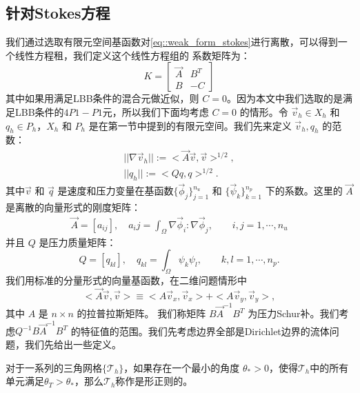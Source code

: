     \subsection{针对Stokes方程}
        我们通过选取有限元空间基函数对\eqref{eq::weak_form_stokes}进行离散，可以得到一个线性方程租，我们定义这个线性方程组的
        系数矩阵为：
        \begin{equation}
            K = \left[
                \begin{array}{ll}
                 \vec{A} & B^T\\
                 B & -C
                \end{array}
                \right]
        \end{equation}
        其中如果用满足LBB条件的混合元做近似，则 $C = 0$。因为本文中我们选取的是满足LBB条件的$4P1-P1$元，所以我们下面均考虑 $C = 0$ 的情形。令 $\vec{v}_h \in X_h$ 和 $q_h \in P_h$，$X_h$ 和 $P_h$ 是在第一节中提到的有限元空间。我们先来定义 $\vec{v}_h, q_h$ 的范数：
        \begin{align}
            ||\nabla \vec{v}_h|| := <\vec{A}\vec{v}, \vec{v}>^{1/2}, \\
            ||q_h|| := <Qq, q>^{1/2}.
            \label{eq::norm}
        \end{align}
        其中$\vec{v}$ 和 $\vec{q}$ 是速度和压力变量在基函数$\{\vec{\phi}_j \}_{j = 1}^{n_u}$ 和 $\{\vec{\psi}_k \}_{k = 1}^{n_p}$ 下的系数。这里的 $\vec{A}$ 是离散的向量形式的刚度矩阵：
        \begin{eqnarray}
            \vec{A} = [a_{ij}], \quad a_ij = \int_\Omega \nabla \vec{\phi}_i : \nabla \vec{\phi}_j, \qquad i,j = 1, \cdots, n_u
        \end{eqnarray}
        并且 $Q$ 是压力质量矩阵：
        \begin{equation}
            Q = [q_{kl}],\quad q_{kl} = \int_\Omega \psi_k \psi_l, \qquad k,l = 1, \cdots, n_p.
        \end{equation}
        我们用标准的分量形式的向量基函数，在二维问题情形中
        \begin{equation}
            <\vec{A}\vec{v}, \vec{v}> \equiv <A\vec{v}_x, \vec{v}_x> + <A\vec{v}_y, \vec{v}_y>,
        \end{equation}
        其中 $A$ 是 $n \times n$ 的拉普拉斯矩阵。
        我们称矩阵 $B \vec{A}^{-1} B^T$ 为压力Schur补。我们考虑$Q^{-1}B\vec{A}^{-1}B^T$ 的特征值的范围。我们先考虑边界全部是Dirichlet边界的流体问题，我们先给出一些定义。
        \begin{definition}
            \label{def::min_angle_cond}对于一系列的三角网格$\{\mathcal{T}_h\}$，如果存在一个最小的角度
            $\theta_* > 0$，使得$\mathcal{T}_h$中的所有单元满足$\theta_{T} > \theta_*$，那么$\mathcal{T}_h$称作是形正则的。
        \end{definition}
